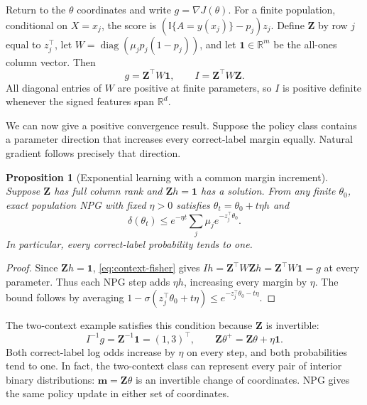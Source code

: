 \documentclass[11pt,twoside]{article}
\newcommand{\I}{\mathbb I}
\newcommand{\R}{\mathbb R}
\newtheorem{proposition}[theorem]{Proposition}
\theoremstyle{definition}
\theoremstyle{remark}
\begin{document}
Return to the $\theta$ coordinates and write $g=\nabla J(\theta)$.
For a finite population, conditional on $X=x_j$, the score is
$(\I\{A=y(x_j)\}-p_j)z_j$. Define $\mathbf Z $ by row $j$ equal to
$z_j^\top$, let $W=\operatorname{diag}(\mu_j p_j(1-p_j))$, and let
$\mathbf1\in\R^m$ be the all-ones column vector.
Then
\begin{equation}
 g=\mathbf Z ^\top W\mathbf1,\qquad I=\mathbf Z ^\top W\mathbf Z.
 \label{eq:context-fisher}
\end{equation}
All diagonal entries of $W$ are positive at finite parameters, so $I$ is positive
definite whenever the signed features span $\R^d$.

We can now give a positive convergence result. Suppose the policy class
contains a parameter direction that increases every correct-label margin
equally. Natural gradient follows precisely that direction.

\begin{proposition}[Exponential learning with a common margin increment]
\label{prop:npg-positive}
Suppose $\mathbf Z $ has full column rank and $\mathbf Z h=\mathbf1$ has a solution.
From any finite $\theta_0$, exact population NPG with fixed $\eta>0$
satisfies $\theta_t=\theta_0+t\eta h$ and
\[
 \delta(\theta_t)\le e^{-\eta t}\sum_j\mu_j e^{-z_j^\top\theta_0}.
\]
In particular, every correct-label probability tends to one.
\end{proposition}
\begin{proof}
Since $\mathbf Z h=\mathbf1$, \cref{eq:context-fisher} gives
$Ih=\mathbf Z ^\top W\mathbf Z h=\mathbf Z ^\top W\mathbf1=g$ at every parameter.
Thus each NPG step adds $\eta h$, increasing every margin by $\eta$.
The bound follows by averaging
$1-\sigma(z_j^\top\theta_0+t\eta)\le e^{-z_j^\top\theta_0-t\eta}$.
\end{proof}

The two-context example satisfies this condition because $\mathbf Z $ is invertible:
\begin{equation}
 I^{-1}g=\mathbf Z ^{-1}\mathbf1=(1,3)^\top,
 \qquad \mathbf Z \theta^+=\mathbf Z \theta+\eta\mathbf1.
 \label{eq:two-context-npg}
\end{equation}
Both correct-label log odds increase by $\eta$ on every step, and both
probabilities tend to one. In fact, the two-context class can represent
every pair of interior binary distributions: $\boldsymbol m=\mathbf Z\theta$ is an invertible
change of coordinates. NPG gives the same policy update in either set of
coordinates.
\end{document}
